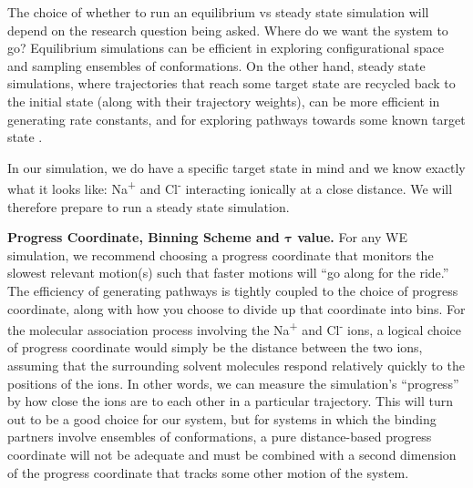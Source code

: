 The choice of whether to run an equilibrium vs steady state simulation will depend on the research question being asked. 
Where do we want the system to go?  
Equilibrium simulations can be efficient in exploring configurational space and sampling ensembles of conformations. 
On the other hand, steady state simulations, where trajectories that reach some target state are recycled back to the initial state (along with their trajectory weights), can be more efficient in generating rate constants, and for exploring pathways towards some known target state \citep{Pratt2019}. 

In our simulation, we do have a specific target state in mind and we know exactly what it looks like: Na\textsuperscript{+} and Cl\textsuperscript{-} interacting ionically at a close distance. 
We will therefore prepare to run a steady state simulation. 

\textbf{Progress Coordinate, Binning Scheme and $\pmb{\tau}$ value.}  For any WE simulation, we recommend choosing a progress coordinate that monitors the slowest relevant motion(s) such that faster motions will “go along for the ride.” 
The efficiency of generating pathways is tightly coupled to the choice of progress coordinate, along with how you choose to divide up that coordinate into bins. 
For the molecular association process involving the Na\textsuperscript{+} and Cl\textsuperscript{-} ions, a logical choice of progress coordinate would simply be the distance between the two ions, assuming that the surrounding solvent molecules respond relatively quickly to the positions of the ions. 
In other words, we can measure the simulation’s “progress” by how close the ions are to each other in a particular trajectory. 
This will turn out to be a good choice for our system, but for systems in which the binding partners involve ensembles of conformations, a pure distance-based progress coordinate will not be adequate and must be combined with a second dimension of the progress coordinate that tracks some other motion of the system.

